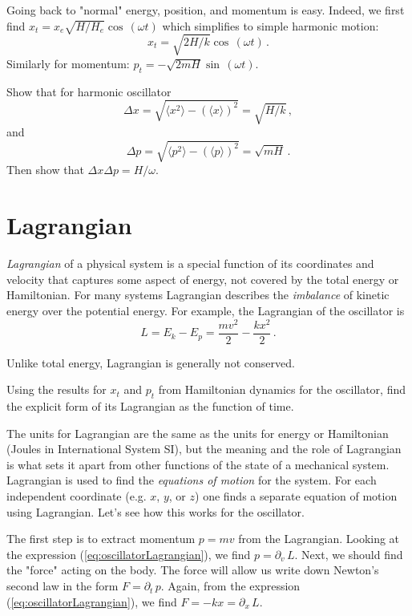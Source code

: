 Going back to "normal" energy, position, and momentum is easy. Indeed, we first find $x_t =x_e \sqrt{H/H_e}\cos\,(\omega t)$ which simplifies to simple harmonic motion:
\[
x_t =\sqrt{2H/k}\cos\,(\omega t)\,.
\] 
Similarly for momentum: $p_t=-\sqrt{2mH}\sin\,(\omega t)$.

\begin{exercise}
	Show that for harmonic oscillator
	\[
	\Delta x = \sqrt{\langle x^2\rangle-(\langle x\rangle)^2} = \sqrt{H/k}\,,
	\]
	and
	\[
	\Delta p = \sqrt{\langle p^2\rangle-(\langle p\rangle)^2} = \sqrt{mH}\,.
	\]
	Then show that $\Delta x\Delta p=H/\omega$.
\end{exercise}

\section{Lagrangian}\label{sec:Lagrangian}
\emph{Lagrangian} of a physical system is a special function of its coordinates and velocity that captures some aspect of energy, not covered by the total energy or Hamiltonian. For many systems Lagrangian describes the \emph{imbalance} of kinetic energy over the potential energy. For example, the Lagrangian of the oscillator is
\begin{equation}
	L = E_k - E_p = \frac{mv^2}{2}-\frac{kx^2}{2}\,.
	\label{eq:oscillatorLagrangian}
\end{equation}
\begin{important}
	Unlike total energy, Lagrangian is generally not conserved.
\end{important}
\begin{exercise}
	Using the results for $x_t$ and $p_t$ from Hamiltonian dynamics for the oscillator, find the explicit form of its Lagrangian as the function of time.
\end{exercise}
The units for Lagrangian are the same as the units for energy or
Hamiltonian (Joules in International System SI), but the meaning and the role
of Lagrangian is what sets it apart from other functions of the state of a mechanical system.
Lagrangian is used to find the \emph{equations of motion} for the system. For each independent coordinate (e.g. $x$, $y$, or $z$) one finds a separate equation of motion using Lagrangian. Let’s see how this works for the oscillator.

The first step is to extract momentum $p=mv$ from the Lagrangian. Looking at the expression (\ref{eq:oscillatorLagrangian}), we find $p=\partial_v\,L$. Next, we should find the "force" acting on the body. The force will allow us write down Newton’s second law in the form $F=\partial_t\,p$. Again, from the expression (\ref{eq:oscillatorLagrangian}), we find $F=-kx=\partial_x\,L$.

